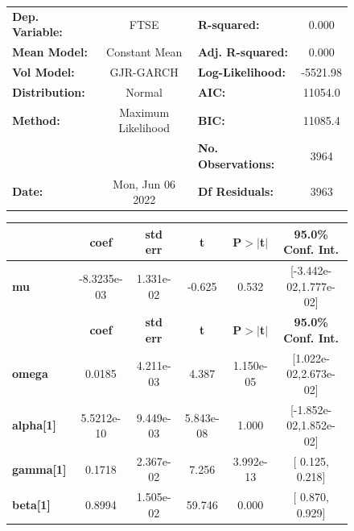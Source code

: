 \documentclass[a4paper, oneside]{discothesis}
\begin{document}
\begin{figure}
\begin{multicols}{2}
{  
\begin{center}
\begin{tabular}{lclc}
\toprule
\textbf{Dep. Variable:} &        FTSE        & \textbf{  R-squared:         } &     0.000   \\
\textbf{Mean Model:}    &   Constant Mean    & \textbf{  Adj. R-squared:    } &     0.000   \\
\textbf{Vol Model:}     &     GJR-GARCH      & \textbf{  Log-Likelihood:    } &   -5521.98  \\
\textbf{Distribution:}  &       Normal       & \textbf{  AIC:               } &    11054.0  \\
\textbf{Method:}        & Maximum Likelihood & \textbf{  BIC:               } &    11085.4  \\
\textbf{}               &                    & \textbf{  No. Observations:  } &    3964     \\
\textbf{Date:}          &  Mon, Jun 06 2022  & \textbf{  Df Residuals:      } &    3963     \\
\bottomrule
\end{tabular}
\begin{tabular}{lccccc}
            & \textbf{coef} & \textbf{std err} & \textbf{t} & \textbf{P$> |$t$|$} & \textbf{95.0\% Conf. Int.}  \\
\midrule
\textbf{mu} &  -8.3235e-03  &    1.331e-02     &    -0.625  &          0.532       &   [-3.442e-02,1.777e-02]    \\
                  & \textbf{coef} & \textbf{std err} & \textbf{t} & \textbf{P$> |$t$|$} & \textbf{95.0\% Conf. Int.}  \\
\midrule
\textbf{omega}    &       0.0185  &    4.211e-03     &     4.387  &      1.150e-05       &   [1.022e-02,2.673e-02]     \\
\textbf{alpha[1]} &   5.5212e-10  &    9.449e-03     & 5.843e-08  &          1.000       &   [-1.852e-02,1.852e-02]    \\
\textbf{gamma[1]} &       0.1718  &    2.367e-02     &     7.256  &      3.992e-13       &     [  0.125,  0.218]       \\
\textbf{beta[1]}  &       0.8994  &    1.505e-02     &    59.746  &        0.000         &     [  0.870,  0.929]       \\
\bottomrule
\end{tabular}
\end{center}

}
\end{multicols}
\end{figure}
\end{document}

